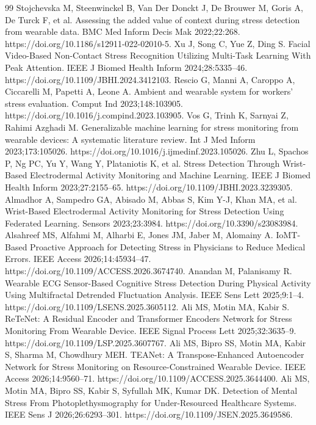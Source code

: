 \begin{thebibliography}{99}
 Stojchevska M, Steenwinckel B, Van Der Donckt J, De Brouwer M, Goris A, De Turck F, et al. Assessing the added value of context during stress detection from wearable data. BMC Med Inform Decis Mak 2022;22:268. https://doi.org/10.1186/s12911-022-02010-5.
 Xu J, Song C, Yue Z, Ding S. Facial Video-Based Non-Contact Stress Recognition Utilizing Multi-Task Learning With Peak Attention. IEEE J Biomed Health Inform 2024;28:5335--46. https://doi.org/10.1109/JBHI.2024.3412103.
 Rescio G, Manni A, Caroppo A, Ciccarelli M, Papetti A, Leone A. Ambient and wearable system for workers’ stress evaluation. Comput Ind 2023;148:103905. https://doi.org/10.1016/j.compind.2023.103905.
 Vos G, Trinh K, Sarnyai Z, Rahimi Azghadi M. Generalizable machine learning for stress monitoring from wearable devices: A systematic literature review. Int J Med Inform 2023;173:105026. https://doi.org/10.1016/j.ijmedinf.2023.105026.
 Zhu L, Spachos P, Ng PC, Yu Y, Wang Y, Plataniotis K, et al. Stress Detection Through Wrist-Based Electrodermal Activity Monitoring and Machine Learning. IEEE J Biomed Health Inform 2023;27:2155--65. https://doi.org/10.1109/JBHI.2023.3239305.
 Almadhor A, Sampedro GA, Abisado M, Abbas S, Kim Y-J, Khan MA, et al. Wrist-Based Electrodermal Activity Monitoring for Stress Detection Using Federated Learning. Sensors 2023;23:3984. https://doi.org/10.3390/s23083984.
 Alsahreef MS, Alfahmi M, Alharbi E, Jones JM, Jaber M, Alomainy A. IoMT-Based Proactive Approach for Detecting Stress in Physicians to Reduce Medical Errors. IEEE Access 2026;14:45934--47. https://doi.org/10.1109/ACCESS.2026.3674740.
 Anandan M, Palanisamy R. Wearable ECG Sensor-Based Cognitive Stress Detection During Physical Activity Using Multifractal Detrended Fluctuation Analysis. IEEE Sens Lett 2025;9:1--4. https://doi.org/10.1109/LSENS.2025.3605112.
 Ali MS, Motin MA, Kabir S. ReTeNet: A Residual Encoder and Transformer Encoders Network for Stress Monitoring From Wearable Device. IEEE Signal Process Lett 2025;32:3635--9. https://doi.org/10.1109/LSP.2025.3607767.
 Ali MS, Bipro SS, Motin MA, Kabir S, Sharma M, Chowdhury MEH. TEANet: A Transpose-Enhanced Autoencoder Network for Stress Monitoring on Resource-Constrained Wearable Device. IEEE Access 2026;14:9560--71. https://doi.org/10.1109/ACCESS.2025.3644400.
 Ali MS, Motin MA, Bipro SS, Kabir S, Syfullah MK, Kumar DK. Detection of Mental Stress From Photoplethysmography for Under-Resourced Healthcare Systems. IEEE Sens J 2026;26:6293--301. https://doi.org/10.1109/JSEN.2025.3649586.

\end{thebibliography}
